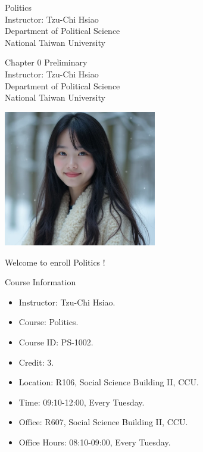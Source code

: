 \documentclass{beamer}
\title{}
\author{}
\date{}
\begin{document}
\begin{frame}
\begin{center}
\Large{Politics} \\
\vspace{3em}
\normalsize{Instructor: Tzu-Chi Hsiao} \\
\vspace{3em}
\small{Department of Political Science} \\
\vspace{1em}
\small{National Taiwan University}
\end{center}
\end{frame}
\begin{frame}
\begin{center}
\Large{Chapter 0 Preliminary} \\
\vspace{3em}
\normalsize{Instructor: Tzu-Chi Hsiao} \\
\vspace{3em}
\small{Department of Political Science} \\
\vspace{1em}
\small{National Taiwan University} \\
\end{center}
\end{frame}
\begin{frame}{}
\begin{center}
\includegraphics[width=0.5\textwidth]{instructor.png}
\end{center}
\vspace{1em}
\begin{center}
\Large{Welcome to enroll Politics !} \\
\end{center}
\end{frame}
\begin{frame}{Course Information}
\begin{itemize}
\pause
\item Instructor: Tzu-Chi Hsiao.
\pause
\item Course: Politics.
\pause
\item Course ID: PS-1002.
\pause
\item Credit: 3.
\pause
\item Location: R106, Social Science Building II, CCU.
\pause
\item Time: 09:10-12:00, Every Tuesday.
\pause
\item Office: R607, Social Science Building II, CCU.
\pause
\item Office Hours: 08:10-09:00, Every Tuesday.
\end{itemize}
\end{frame}
\end{document}

